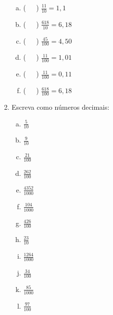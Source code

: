 \documentclass[a4paper,14pt]{article}
\begin{document}
\begin{multicols}{2}
\begin{enumerate}
\begin{enumerate}[a)]
		    	\item (~~~) $\frac{11}{10} = 1,1$
		    	\item (~~~) $\frac{618}{10} = 6,18$
		    	\item (~~~) $\frac{45}{100} = 4,50$
		    	\item (~~~) $\frac{11}{100} = 1,01$
		    	\item (~~~) $\frac{11}{100} = 0,11$
		    	\item (~~~) $\frac{618}{100} = 6,18$
		    \end{enumerate}
	        \item Escreva como números decimais:
	        \begin{enumerate}[a)]
	        	\item $\frac{5}{10}$
	        	\item $\frac{9}{10}$
	        	\item $\frac{21}{100}$
	        	\item $\frac{262}{100}$
	        	\item $\frac{4352}{1000}$
	        	\item $\frac{104}{1000}$
	        	\item $\frac{426}{100}$
	        	\item $\frac{23}{10}$
	        	\item $\frac{1264}{1000}$
	        	\item $\frac{34}{100}$
	        	\item $\frac{85}{1000}$
	        	\item $\frac{97}{100}$
	        \end{enumerate}
    	\end{enumerate}
    $~$ \\ $~$ \\ $~$ \\ $~$ \\ $~$ \\ $~$ \\ $~$ \\ $~$ \\ $~$ \\ $~$ \\ $~$ \\ $~$ \\ $~$ \\ $~$ \\ $~$ \\ $~$ \\ $~$ \\ $~$ \\ $~$ \\ $~$ \\ $~$ \\ 
    \end{multicols}
\end{document}
